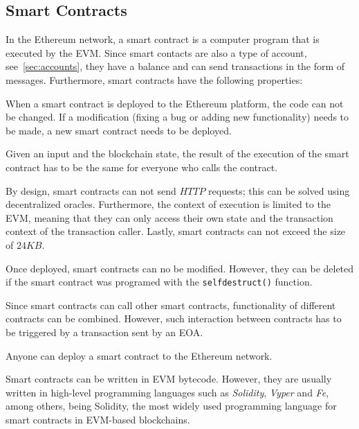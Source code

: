 \documentclass[11pt,a4paper]{report}
\begin{document}
\subsection{Smart Contracts}\label{sec:sc}
In the Ethereum network, a smart contract\cite{book:masteringETH-sc-solidity}\cite{smartcontracts} is a computer program that is executed by the EVM. Since smart contacts are also a type of account, see~\ref{sec:accounts}, they have a balance and can send transactions in the form of messages. Furthermore, smart contracts have the following properties:
\begin{description}[style=nextline] %
	\item[{\textbf{Immutability}}] When a smart contract is deployed to the Ethereum platform, the code can not be changed. If a modification (fixing a bug or adding new functionality) needs to be made, a new smart contract needs to be deployed.
	\item[{\textbf{Determinism}}] Given an input and the blockchain state, the result of the execution of the smart contract has to be the same for everyone who calls the contract.
	\item[{\textbf{Limitations}}] By design, smart contracts can not send $HTTP$ requests; this can be solved using decentralized oracles\cite{oracles}. Furthermore, the context of execution is limited to the EVM, meaning that they can only access their own state and the transaction context of the transaction caller. Lastly, smart contracts can not exceed the size of $24KB$.
	\item[{\textbf{Lifecycle}}] Once deployed, smart contracts can no be modified. However, they can be deleted if the smart contract was programed with the \verb|selfdestruct()| function.
	\item[{\textbf{Composability}}] Since smart contracts can call other smart contracts, functionality of different contracts can be combined. However, such interaction between contracts has to be triggered by a transaction sent by an EOA.
	\item[{\textbf{Permissionless}}] Anyone can deploy a smart contract to the Ethereum network.    
\end{description}
Smart contracts can be written in EVM bytecode\cite{evmbytecode}. However, they are usually written in high-level programming languages such as \textit{Solidity}, \textit{Vyper}\cite{vyper} and \textit{Fe}\cite{fe}, among others, being Solidity, the most widely used programming language for smart contracts in EVM-based blockchains.
\end{document}
